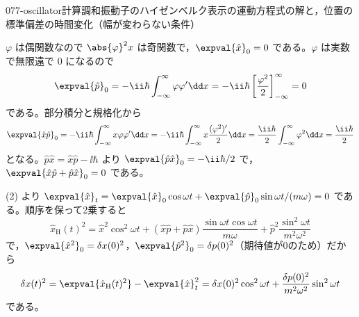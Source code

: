 \documentclass[uplatex,dvipdfmx,a4paper,11pt]{jsarticle}
\begin{document}
\begin{mondai}{077-oscillator}{計算}{調和振動子のハイゼンベルク表示の運動方程式の解と，位置の標準偏差の時間変化（幅が変わらない条件）}
\begin{tadashii}
 $\varphi$ は偶関数なので $\abs{\varphi}^{2}x$ は奇関数で，$\expval{\hat{x}}_{0}=0$ である。$\varphi$ は実数で無限遠で $0$ になるので
\[ \expval{\hat{p}}_{0}=-\ii\hbar\int_{-\infty}^{\infty}\varphi\varphi'\dd x=-\ii\hbar\left[\frac{\varphi^{2}}{2}\right]_{-\infty}^{\infty}=0 \]
である。部分積分と規格化から
\[ \expval{\hat{x}\hat{p}}_{0}=-\ii\hbar\int_{-\infty}^{\infty}x\varphi\varphi'\dd x=-\ii\hbar\int_{-\infty}^{\infty}x\frac{(\varphi^{2})'}{2}\dd x=\frac{\ii\hbar}{2}\int_{-\infty}^{\infty}\varphi^{2}\dd x=\frac{\ii\hbar}{2} \]
となる。$\hat{p}\hat{x}=\hat{x}\hat{p}-\ii\hbar$ より $\expval{\hat{p}\hat{x}}_{0}=-\ii\hbar/2$ で，$\expval{\hat{x}\hat{p}+\hat{p}\hat{x}}_{0}=0$ である。

(2) より $\expval{\hat{x}}_{t}=\expval{\hat{x}}_{0}\cos\omega t+\expval{\hat{p}}_{0}\sin\omega t/(m\omega)=0$ である。順序を保って2乗すると
\[ \hat{x}_{\mathrm{H}}(t)^{2}=\hat{x}^{2}\cos^{2}\omega t+(\hat{x}\hat{p}+\hat{p}\hat{x})\frac{\sin\omega t\cos\omega t}{m\omega}+\hat{p}^{2}\frac{\sin^{2}\omega t}{m^{2}\omega^{2}} \]
で，$\expval{\hat{x}^{2}}_{0}=\delta x(0)^{2}$，$\expval{\hat{p}^{2}}_{0}=\delta p(0)^{2}$（期待値が0のため）だから
\[ \delta x(t)^{2}=\expval{\hat{x}_{\mathrm{H}}(t)^{2}}-\expval{\hat{x}}_{t}^{2}=\delta x(0)^{2}\cos^{2}\omega t+\frac{\delta p(0)^{2}}{m^{2}\omega^{2}}\sin^{2}\omega t \]
である。


\end{tadashii}
\end{mondai}
\end{document}
